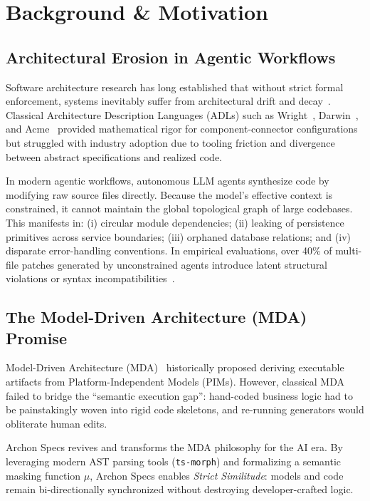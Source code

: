 \section{Background \& Motivation}
\label{sec:background}

\subsection{Architectural Erosion in Agentic Workflows}
Software architecture research has long established that without strict formal enforcement, systems inevitably suffer from architectural drift and decay~\cite{perry1992foundations,medvidovic2000classification,rosik2011industrial}. Classical Architecture Description Languages (ADLs) such as Wright~\cite{allen1997formal}, Darwin~\cite{magee1996dynamic}, and Acme~\cite{garlan2000acme} provided mathematical rigor for component-connector configurations but struggled with industry adoption due to tooling friction and divergence between abstract specifications and realized code.

In modern agentic workflows, autonomous LLM agents synthesize code by modifying raw source files directly. Because the model's effective context is constrained, it cannot maintain the global topological graph of large codebases. This manifests in: (i) circular module dependencies; (ii) leaking of persistence primitives across service boundaries; (iii) orphaned database relations; and (iv) disparate error-handling conventions. In empirical evaluations, over 40\% of multi-file patches generated by unconstrained agents introduce latent structural violations or syntax incompatibilities~\cite{jimenez2024swebench,hou2024large}.

\subsection{The Model-Driven Architecture (MDA) Promise}
Model-Driven Architecture (MDA)~\cite{kleppe2003mda,czarnecki2000generative,steinberg2008emf} historically proposed deriving executable artifacts from Platform-Independent Models (PIMs). However, classical MDA failed to bridge the ``semantic execution gap'': hand-coded business logic had to be painstakingly woven into rigid code skeletons, and re-running generators would obliterate human edits.

Archon Specs revives and transforms the MDA philosophy for the AI era. By leveraging modern AST parsing tools (\texttt{ts-morph}) and formalizing a semantic masking function $\mu$, Archon Specs enables \emph{Strict Similitude}: models and code remain bi-directionally synchronized without destroying developer-crafted logic.


